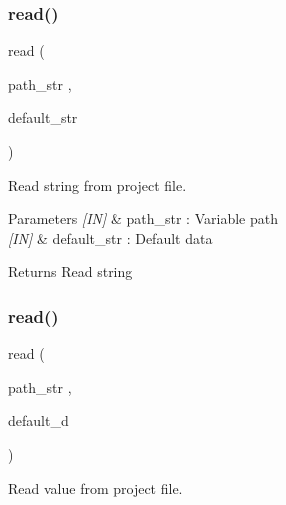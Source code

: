 \subsubsection{read()\hspace{0.1cm}{\footnotesize\ttfamily [1/2]}}
{\footnotesize\ttfamily read (\begin{DoxyParamCaption}\item[{path\+\_\+str}]{,  }\item[{default\+\_\+str}]{ }\end{DoxyParamCaption})}



Read string from project file. 


\begin{DoxyCode}{0}
\end{DoxyCode}



\begin{DoxyParams}{Parameters}
{\em \mbox{[}\+I\+N\mbox{]}} & path\+\_\+str \+: Variable path \\
\hline
{\em \mbox{[}\+I\+N\mbox{]}} & default\+\_\+str \+: Default data \\
\hline
\end{DoxyParams}
\begin{DoxyReturn}{Returns}
Read string 
\end{DoxyReturn}
\mbox{\label{classproject_affb82cb3ad891bffd251ea2752bc2d13}} 
\subsubsection{read()\hspace{0.1cm}{\footnotesize\ttfamily [2/2]}}
{\footnotesize\ttfamily read (\begin{DoxyParamCaption}\item[{path\+\_\+str}]{,  }\item[{default\+\_\+d}]{ }\end{DoxyParamCaption})}



Read value from project file. 


\begin{DoxyCode}{0}
\end{DoxyCode}



